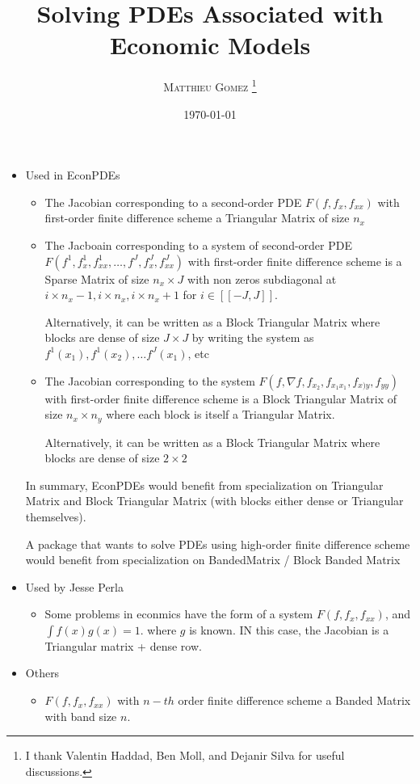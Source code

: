 \documentclass[english]{article}
\begin{document}
	\title{Solving PDEs Associated with Economic Models}
	\author{\large{\textsc{Matthieu Gomez \thanks{I thank Valentin Haddad, Ben Moll, and Dejanir Silva for useful discussions.}}}}
	\date{\today}
	\maketitle

	\begin{itemize}
		\item Used in EconPDEs
		\begin{itemize}
			\item 	The Jacobian corresponding to a second-order PDE $F(f, f_x, f_{xx})$ with first-order finite difference scheme a Triangular Matrix of size $n_x$
			\item The Jacboain corresponding to a system of second-order PDE $F(f^1, f^1_x, f^1_{xx}, \dots, f^J, f^J_x, f^J_{xx})$ with first-order finite difference scheme is a Sparse Matrix of size $n_x \times J$ with non zeros subdiagonal at  $i\times n_x-1, i \times n_x, i \times n_x +1$ for $i \in [[-J, J]]$. \par
			Alternatively, it can be written as a Block Triangular Matrix where blocks are dense of size $J\times J$ by writing the system as $f^1(x_1), f^1(x_2), \dots f^J(x_1)$, etc
			\item  The Jacobian corresponding to the system $F(f, \nabla f, f_{x_2}, f_{x_1x_1}, f_{x)y}, f_{yy})$  with first-order finite difference scheme is a Block Triangular Matrix of size $n_x\times n_y$ where each block is itself a Triangular Matrix. \par
			Alternatively, it can be written as a Block Triangular Matrix where blocks are dense of size $2\times 2$
		\end{itemize}
		In summary, EconPDEs would benefit from specialization on Triangular Matrix and Block Triangular Matrix (with blocks either dense or Triangular themselves).\par
		A package that wants to solve PDEs using high-order finite difference scheme would benefit from specialization on BandedMatrix / Block Banded Matrix
		\item Used by Jesse Perla
		\begin{itemize}
			\item Some problems in econmics have the form of a system $F(f, f_x, f_{xx})$, and $\int f(x) g(x) =1$. where $g$ is known. IN this case, the Jacobian is a Triangular matrix + dense row.
		\end{itemize}
		\item Others
		\begin{itemize}		
			\item 	$F(f, f_x, f_{xx})$ with $n-th$ order finite difference scheme a Banded Matrix with band size $n$. 
		\end{itemize}
	\end{itemize}
	
\end{document}
